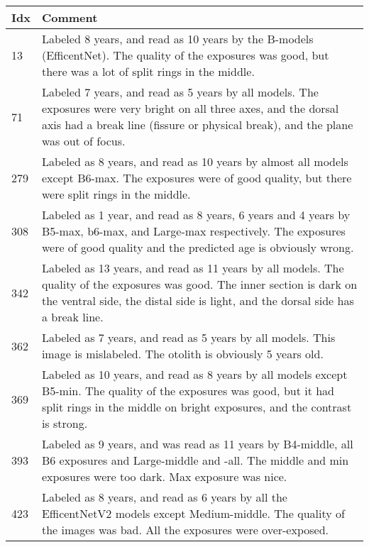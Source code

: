 \documentclass[10pt,letterpaper]{article}
\begin{document}
\pagebreak
    \centering
    \begingroup
    \captionsetup[table]{hypcap=false}
    \setlength\tabcolsep{1.5pt} %
    \renewcommand{\arraystretch}{0.8}
    \begin{tabular}{|l|p{13cm}|}
    \hline
        Idx & Comment \\ \hline
        13  & Labeled 8 years, and read as 10 years by the B-models (EfficentNet).
              The quality of the exposures was good, but there was a lot of split rings in the middle. \\ \hline
        71  & Labeled 7 years, and read as 5 years by all models. 
              The exposures were very bright on all three axes, and the dorsal axis had a break line (fissure or physical break), and the plane was out of focus. \\ \hline
        279 & Labeled as 8 years, and read as 10 years by almost all models except B6-max. 
              The exposures were of good quality, but there were split rings in the middle. \\ \hline
        308 & Labeled as 1 year, and read as 8 years, 6 years and 4 years by B5-max, b6-max, and Large-max respectively.  
              The exposures were of good quality and the predicted age is obviously wrong. \\ \hline
        342 & Labeled as 13 years, and read as 11 years by all models. The quality of the exposures was good. 
              The inner section is dark on the ventral side, the distal side is light, and the dorsal side has a break line.  \\ \hline
        362 & Labeled as 7 years, and read as 5 years by all models. This image is mislabeled. The otolith is obviously 5 years old.\\ \hline
        369 & Labeled as 10 years, and read as 8 years by all models except B5-min.   
              The quality of the exposures was good, but it had split rings in the middle on bright exposures, and the contrast is strong. \\ \hline
        393 & Labeled as 9 years, and was read as 11 years by B4-middle, all B6 exposures and Large-middle and -all. 
              The middle and min exposures were too dark. Max exposure was nice. \\ \hline
        423 & Labeled as 8 years, and read as 6 years by all the EfficentNetV2 models except Medium-middle. 
              The quality of the images was bad. All the exposures were over-exposed. \\ \hline  
    \end{tabular}
\label{table10b}
\endgroup
\end{document}
